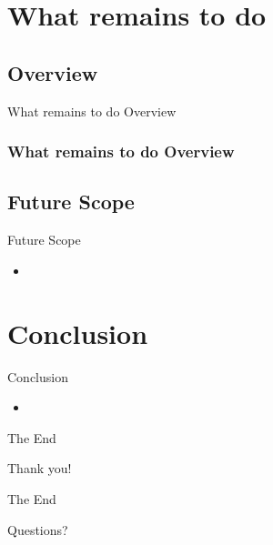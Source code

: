 \documentclass[hideothersubsections, t, aspectratio=1610]{beamer}
\begin{document}
\section{What remains to do}

\subsection{Overview}
\begin{frame}{What remains to do Overview}
	
	\frametitle{What remains to do Overview}
	
\end{frame}

\subsection{Future Scope}
\begin{frame}{Future Scope}
\begin{itemize}
\item
\end{itemize}

\end{frame}

\section{Conclusion}
\begin{frame}{Conclusion}
\begin{itemize}
\item
\end{itemize}

\end{frame}

\begin{frame}{The End}
\begin{center}
\Huge Thank you!
\end{center}
\end{frame}

\begin{frame}{The End}
\begin{center}
\Huge Questions?
\end{center}
\end{frame}
\end{document}
